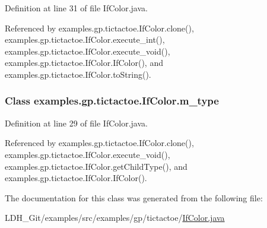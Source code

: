 Definition at line 31 of file If\-Color.\-java.



Referenced by examples.\-gp.\-tictactoe.\-If\-Color.\-clone(), examples.\-gp.\-tictactoe.\-If\-Color.\-execute\-\_\-int(), examples.\-gp.\-tictactoe.\-If\-Color.\-execute\-\_\-void(), examples.\-gp.\-tictactoe.\-If\-Color.\-If\-Color(), and examples.\-gp.\-tictactoe.\-If\-Color.\-to\-String().

\hypertarget{classexamples_1_1gp_1_1tictactoe_1_1_if_color_a6b0c3ee2e79718064192de87890f032e}{
\subsubsection[{m\-\_\-type}]{\setlength{\rightskip}{0pt plus 5cm}Class examples.\-gp.\-tictactoe.\-If\-Color.\-m\-\_\-type\hspace{0.3cm}{\ttfamily [private]}}}\label{classexamples_1_1gp_1_1tictactoe_1_1_if_color_a6b0c3ee2e79718064192de87890f032e}


Definition at line 29 of file If\-Color.\-java.



Referenced by examples.\-gp.\-tictactoe.\-If\-Color.\-clone(), examples.\-gp.\-tictactoe.\-If\-Color.\-execute\-\_\-void(), examples.\-gp.\-tictactoe.\-If\-Color.\-get\-Child\-Type(), and examples.\-gp.\-tictactoe.\-If\-Color.\-If\-Color().



The documentation for this class was generated from the following file\-:\begin{DoxyCompactItemize}
\item 
L\-D\-H\-\_\-\-Git/examples/src/examples/gp/tictactoe/\hyperlink{_if_color_8java}{If\-Color.\-java}\end{DoxyCompactItemize}
